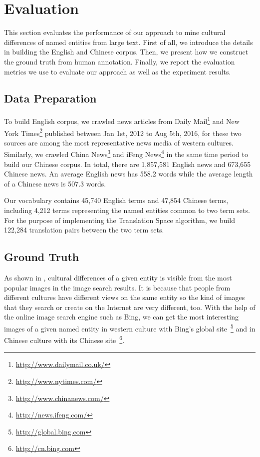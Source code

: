 \section{Evaluation}

This section evaluates the performance of our approach to mine cultural differences of named entities from large text.
First of all, we introduce the details in building the English and
Chinese corpus.
Then, we present how we construct the ground truth from human annotation.
Finally, we report the evaluation metrics we use to evaluate our approach
as well as the experiment results.

\subsection{Data Preparation}

To build English corpus, we  crawled news articles from Daily Mail\footnote{\url{http://www.dailymail.co.uk/}} and New York Times\footnote{\url{http://www.nytimes.com/}}
published between Jan 1st, 2012 to Aug 5th, 2016, for these two sources
are among the most representative news media of western cultures.
Similarly, we crawled China News\footnote{\url{http://www.chinanews.com/}}
and iFeng News\footnote{\url{http://news.ifeng.com/}} in the same time period to build our Chinese corpus.
In total, there are 1,857,581 English news and 673,655 Chinese news.
An average English news has 558.2 words while the average length of a
Chinese news is 507.3 words.

Our vocabulary contains 45,740 English terms and
47,854 Chinese terms,  including 4,212 terms representing the
named entities common to two term sets.
For the purpose of implementing the Translation Space algorithm,
we build 122,284 translation pairs between the two term sets.

\subsection{Ground Truth}

As shown in , cultural differences of a given entity
is visible from the most popular images in the image search results.
It is because that people from different cultures have different views
on the same entity so the kind of images that they search or create
on the Internet are very different, too.
With the help of the online image search engine such as Bing,
we can get the most interesting images of a given named entity
in western culture with Bing's global
site~\footnote{\url{http://global.bing.com}} and in Chinese culture
with its Chinese site~\footnote{\url{http://cn.bing.com}}.

